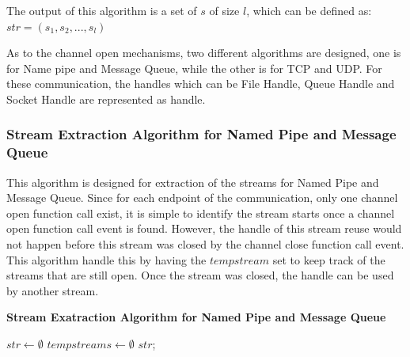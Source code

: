 The output of this algorithm is a set of $s$ of size $l$, which can be defined as:
$str = (s_1, s_2, ..., s_l)$

As to the channel open mechanisms, two different algorithms are designed, one is for Name pipe and Message Queue, while the other is for TCP and UDP. For these communication, the handles which can be File Handle, Queue Handle and Socket Handle are represented as handle.

\subsubsection{Stream Extraction Algorithm for Named Pipe and Message Queue}
This algorithm is designed for extraction of the streams for Named Pipe and Message Queue. Since for each endpoint of the communication, only one channel open function call exist, it is simple to identify the stream starts once a channel open function call event is found. However, the handle of this stream reuse would not happen before this stream was closed by the channel close function call event. This algorithm handle this by having the $tempstream$ set to keep track of the streams that are still open. Once the stream was closed, the handle can be used by another stream.
\begin{algorithm}[H]
\DontPrintSemicolon
\caption{{\bf Stream Exatraction Algorithm for Named Pipe and Message Queue} \label{streamext1}}
$str \leftarrow \emptyset$\; 
$tempstreams \leftarrow \emptyset$\; \;  
\KwRet $str$;\;
\end{algorithm} 

